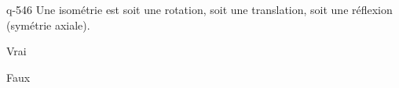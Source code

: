 \begin{truefalse}{q-546}
Une isométrie est soit une rotation, soit une translation, soit une réflexion (symétrie axiale).
\item Vrai
\item* Faux
\end{truefalse}


